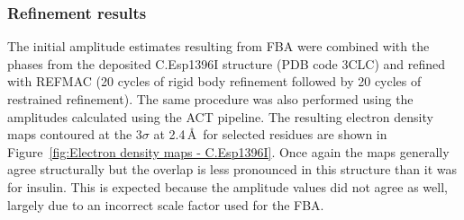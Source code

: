 \subsubsection{Refinement results}
\label{subs:Refinement results - C.Esp1396I}
The initial amplitude estimates resulting from FBA were combined with the phases from the deposited C.Esp1396I structure (PDB code 3CLC) and refined with REFMAC \cite{murshudov2011refmac5} (20 cycles of rigid body refinement followed by 20 cycles of restrained refinement).
The same procedure was also performed using the amplitudes calculated using the ACT pipeline.
The resulting electron density maps contoured at the 3$\sigma$ at 2.4$\,$\AA\ for selected residues are shown in Figure~\ref{fig:Electron density maps - C.Esp1396I}.
Once again the maps generally agree structurally but the overlap is less pronounced in this structure than it was for insulin.
This is expected because the amplitude values did not agree as well, largely due to an incorrect scale factor used for the FBA.
